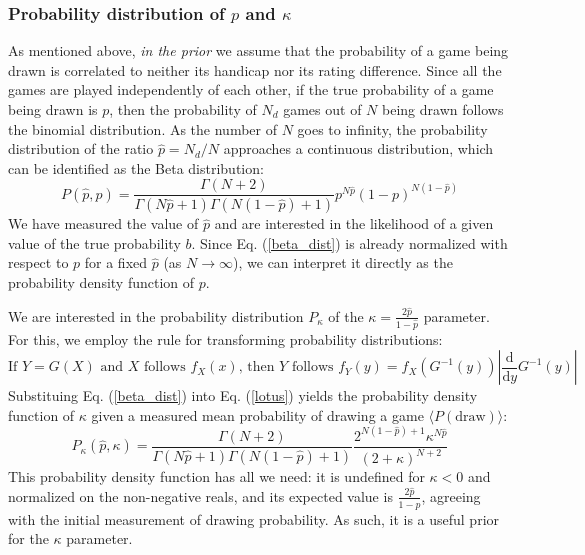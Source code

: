 \documentclass[12pt]{article}
\begin{document}
	\subsubsection{Probability distribution of $p$ and $\kappa$}
	As mentioned above, \textit{in the prior} we assume that the probability of a game being drawn is correlated to neither its handicap nor its rating difference. Since all the games are played independently of each other, if the true probability of a game being drawn is $p$, then the probability of $N_d$ games out of $N$ being drawn follows the binomial distribution. As the number of $N$ goes to infinity, the probability distribution of the ratio $\hat{p}=N_d/N$ approaches a continuous distribution, which can be identified as the Beta distribution:
	\begin{equation} \label{beta_dist}
	P(\hat{p},p)=\frac{\Gamma(N+2)}{\Gamma(N\hat{p}+1)\Gamma(N(1-\hat{p})+1)}p^{N\hat{p}}(1-p)^{N(1-\hat{p})}
	\end{equation}
	We have measured the value of $\hat{p}$ and are interested in the likelihood of a given value of the true probability $b$. Since Eq. (\ref{beta_dist}) is already normalized with respect to $p$ for a fixed $\hat{p}$ (as $N\to\infty$), we can interpret it directly as the probability density function of $p$. 
	
	We are interested in the probability distribution $P_\kappa$ of the $\kappa=\frac{2\hat{p}}{1-\hat{p}}$ parameter. For this, we employ the rule for transforming probability distributions:
	\begin{equation}\label{lotus}
	\text{If }Y=G(X)\text{ and }X\text{ follows }f_X(x)\text{, then }Y\text{ follows }f_Y(y)=f_X(G^{-1}(y))\left|\frac{\text{d}}{\text{d}y}G^{-1}(y)\right|
	\end{equation}
	Substituing Eq. (\ref{beta_dist}) into Eq. (\ref{lotus}) yields the probability density function of $\kappa$ given a measured mean probability of drawing a game $\langle P(\text{draw})\rangle$:
	\begin{equation} \label{draw_prob}
	P_\kappa(\hat{p},\kappa)=\frac{\Gamma(N+2)}{\Gamma(N\hat{p}+1)\Gamma(N(1-\hat{p})+1)}\frac{2^{N(1-\hat{p})+1}\kappa^{N\hat{p}}}{(2+\kappa)^{N+2}}
	\end{equation}
	This probability density function has all we need: it is undefined for $\kappa<0$ and normalized on the non-negative reals, and its expected value is $\frac{2\hat{p}}{1-\hat{p}}$, agreeing with the initial measurement of drawing probability. As such, it is a useful prior for the $\kappa$ parameter.
	
\end{document}
